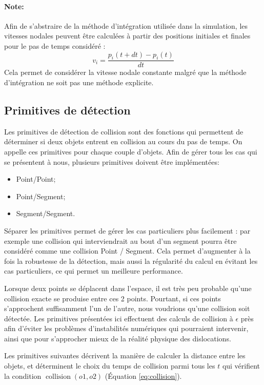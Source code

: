 \documentclass[11pt,class=article,float=false,crop=false]{standalone}
\begin{document}
\paragraph{Note:}
Afin de s'abstraire de la méthode d'intégration utilisée dans la simulation, les vitesses nodales peuvent être calculées à partir des positions initiales et finales pour le pas de temps considéré : 
\begin{equation}
	v_i =  \frac{ p_i(t+dt) - p_i(t) }{dt}
\end{equation}
Cela permet de considérer la vitesse nodale constante malgré que la méthode d'intégration ne soit pas une méthode explicite.



\subsection{Primitives de détection}
\label{sec:primitives_collision}

Les primitives de détection de collision sont des fonctions qui permettent de déterminer si deux objets entrent en collision au cours du pas de temps. On appelle ces primitives pour chaque couple d'objets. Afin de gérer tous les cas qui se présentent à nous, plusieurs primitives doivent être implémentées:
\begin{itemize}
	\item Point/Point;
	\item Point/Segment;
	\item Segment/Segment.
\end{itemize} 

Séparer les primitives permet de gérer les cas particuliers plus facilement : par exemple une collision qui interviendrait au bout d'un segment pourra être considéré comme une collision Point / Segment. Cela permet d'augmenter à la fois la robustesse de la détection, mais aussi la régularité du calcul en évitant les cas particuliers, ce qui permet un meilleure performance.

Lorsque deux points se déplacent dans l'espace, il est très peu probable qu'une collision exacte se produise entre ces 2 points. Pourtant, si ces points s’approchent suffisamment l'un de l'autre, nous voudrions qu'une collision soit détectée. Les primitives présentées ici effectuent des calculs de collision à $\epsilon$ près afin d'éviter les problèmes d'instabilités numériques qui pourraient intervenir, ainsi que pour s'approcher mieux de la réalité physique des dislocations. 

Les primitives suivantes décrivent la manière de calculer la distance entre les objets, et déterminent le choix du temps de collision parmi tous les $t$ qui vérifient la condition $\operatorname{collision}(o1,o2)$ (Équation \ref{eq:collision}). 
\end{document}
